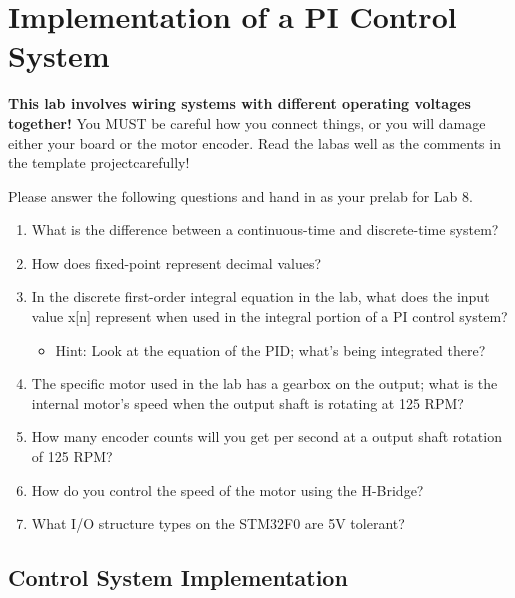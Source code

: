 \documentclass[openany,11pt,fleqn]{book} %
\begin{document}
	
\chapter{Implementation of a PI Control System}

\begin{warning}
    \textbf{This lab involves wiring systems with different operating voltages together!} You MUST be careful how you connect things, or you will damage either your board or the motor encoder. Read the lab\textemdash as well as the comments in the template project\textemdash carefully!
\end{warning}

\begin{question}[Prelab 8]
	Please answer the following questions and hand in as your prelab for Lab 8.
	\begin{enumerate}
		\item What is the difference between a continuous-time and discrete-time system?
		\item How does fixed-point represent decimal values?
		\item In the discrete first-order integral equation in the lab, what does the input value x[n] represent when used in the integral portion of a PI control system? 
		\begin{itemize}
			\item Hint: Look at the equation of the PID; what's being integrated there?
		\end{itemize}
		\item The specific motor used in the lab has a gearbox on the output; what is the internal motor's speed when the output shaft is rotating at 125 RPM?
		\item How many encoder counts will you get per second at a output shaft rotation of 125 RPM?
		\item How do you control the speed of the motor using the H-Bridge?
		\item What I/O structure types on the STM32F0 are 5V tolerant?
	\end{enumerate}
\end{question}

\section{Control System Implementation}
\end{document}
